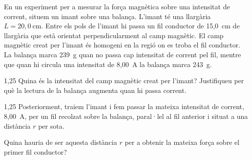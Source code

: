 En un experiment per a mesurar la força magnètica sobre una intensitat de corrent, situem un imant sobre una balança. L'imant té una llargària $L = 20,0\ \mathrm{cm}$. Entre els pols de l'imant hi passa un fil conductor de 15,0~cm de llargària que està orientat perpendicularment al camp magnètic. El camp magnètic creat per l'imant és homogeni en la regió on es troba el fil conductor. La balança marca 239~g quan no passa cap intensitat de corrent pel fil, mentre que quan hi circula una intensitat de 8,00~A la balança marca 243~g.


\begin{apartat}{1,25}
Quina és la intensitat del camp magnètic creat per l'imant? Justifiqueu per què la lectura de la balança augmenta quan hi passa corrent.
\end{apartat}

\begin{apartat}{1,25}
Posteriorment, traiem l'imant i fem passar la mateixa intensitat de corrent, 8,00~A, per un fil recolzat sobre la balança, paral·lel al fil anterior i situat a una distància $r$ per sota.


Quina hauria de ser aquesta distància $r$ per a obtenir la mateixa força sobre el primer fil conductor?
\end{apartat}

